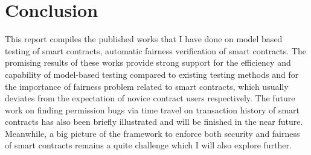 \chapter{Conclusion} %
\label{ch:conclusion} %

This report compiles the published works that I have done on model based testing of smart contracts, automatic fairness verification of smart contracts.
The promising results of these works provide strong support for the efficiency and capability of model-based testing compared to existing testing methods 
and for the importance of fairness problem related to smart contracts, which usually deviates from the expectation of novice contract users respectively.
The future work on finding permission bugs via time travel on transaction history of smart contracts has also been briefly illustrated and will be finished in the near future.
Meanwhile, a big picture of the framework to enforce both security and fairness of smart contracts remains a quite challenge which I will also explore further.
